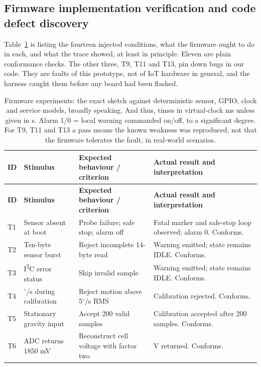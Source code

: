 \documentclass[10pt,a4paper]{article}
\newcommand{\degree}{\ensuremath{^{\circ}}}
\begin{document}
\subsection{Firmware implementation verification and code defect discovery}
Table~\ref{tab:tests} is listing the fourteen injected conditions, what the firmware ought to do in each, and what the trace showed, at least in principle. Eleven are plain conformance checks. The other three, T9, T11 and T13, pin down bugs in our code. They are faults of this prototype, not of IoT hardware in general, and the harness caught them before any board had been flashed.

\small
\begin{longtable}{|>{\raggedright\arraybackslash}p{.05\linewidth}|>{\raggedright\arraybackslash}p{.21\linewidth}|>{\raggedright\arraybackslash}p{.28\linewidth}|>{\raggedright\arraybackslash}p{.35\linewidth}|}
\caption{Firmware experiments: the exact sketch against deterministic sensor, GPIO, clock and service models, broadly speaking. And thus, times in virtual-clock ms unless given in s. Alarm 1/0 = local warning commanded on/off, to a significant degree. For T9, T11 and T13 a pass means the known weakness was reproduced, not that the firmware tolerates the fault, in real-world scenarios.}\label{tab:tests}\\
\hline
\textbf{ID} & \textbf{Stimulus} & \textbf{Expected behaviour / criterion} & \textbf{Actual result and interpretation}\\\hline\endfirsthead
\hline
\textbf{ID} & \textbf{Stimulus} & \textbf{Expected behaviour / criterion} & \textbf{Actual result and interpretation}\\\hline\endhead
T1 & Sensor absent at boot & Probe failure; safe stop; alarm off & Fatal marker and safe-stop loop observed; alarm 0. Conforms.\\\hline
T2 & Ten-byte sensor burst & Reject incomplete 14-byte read & Warning emitted; state remains IDLE. Conforms.\\\hline
T3 & I\textsuperscript{2}C error status & Skip invalid sample & Warning emitted; state remains IDLE. Conforms.\\\hline
T4 & 100$\degree$/s during calibration & Reject motion above 5$\degree$/s RMS & Calibration rejected. Conforms.\\\hline
T5 & Stationary gravity input & Accept 200 valid samples & Calibration accepted after 200 samples. Conforms.\\\hline
T6 & ADC returns 1850 mV & Reconstruct cell voltage with factor two & 3.700 V returned. Conforms.\\\hline

\end{longtable}
\end{document}
